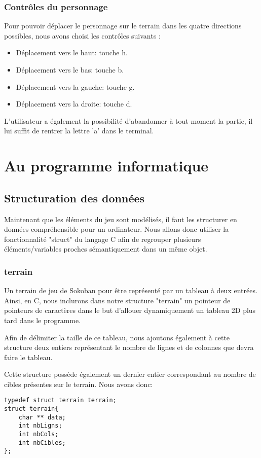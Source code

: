 \documentclass[10pt,a4paper,french,titlepage]{article}
\begin{document}
\subsubsection{Contrôles du personnage}
Pour pouvoir déplacer le personnage sur le terrain dans les quatre directions possibles, nous avons choisi les contrôles suivants :
\begin{itemize}
\item Déplacement vers le haut: touche h.
\item Déplacement vers le bas: touche b.
\item Déplacement vers la gauche: touche g.
\item Déplacement vers la droite: touche d.
\end{itemize}
L'utilisateur a également la possibilité d'abandonner à tout moment la partie, il lui suffit de rentrer la lettre 'a' dans le terminal.
\newpage
\section{Au programme informatique}
\subsection{Structuration des données}
Maintenant que les éléments du jeu sont modélisés, il faut les structurer en données compréhensible pour un ordinateur. Nous allons donc utiliser la fonctionnalité "struct" du langage C afin de regrouper plusieurs éléments/variables proches sémantiquement dans un même objet.
\subsubsection{terrain}
Un terrain de jeu de Sokoban pour être représenté par un tableau à deux entrées. Ainsi, en C, nous inclurons dans notre structure "terrain" un pointeur de pointeurs de caractères dans le but d'allouer dynamiquement un tableau 2D plus tard dans le programme. 

Afin de délimiter la taille de ce tableau, nous ajoutons également à cette structure deux entiers représentant le nombre de lignes et de colonnes que devra faire le tableau. 

Cette structure possède également un dernier entier correspondant au nombre de cibles présentes sur le terrain.
Nous avons donc:
\begin{lstlisting}
typedef struct terrain terrain;
struct terrain{
    char ** data;
    int nbLigns;
    int nbCols;
    int nbCibles;
};
\end{lstlisting}
\end{document}
